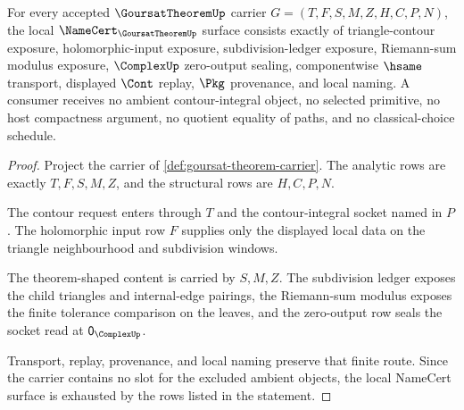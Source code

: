 \begin{theorem}
\label{thm:goursat-theorem-namecert-obligations}
For every accepted $\GoursatTheoremUp$ carrier $G=(T,F,S,M,Z,H,C,P,N)$, the local $\NameCert_{\GoursatTheoremUp}$ surface consists exactly of triangle-contour exposure, holomorphic-input exposure, subdivision-ledger exposure, Riemann-sum modulus exposure, $\ComplexUp$ zero-output sealing, componentwise $\hsame$ transport, displayed $\Cont$ replay, $\Pkg$ provenance, and local naming. A consumer receives no ambient contour-integral object, no selected primitive, no host compactness argument, no quotient equality of paths, and no classical-choice schedule.
\end{theorem}
\begin{proof}
Project the carrier of \autoref{def:goursat-theorem-carrier}. The analytic rows are exactly $T,F,S,M,Z$, and the structural rows are $H,C,P,N$.

The contour request enters through $T$ and the contour-integral socket named in $P$. The holomorphic input row $F$ supplies only the displayed local data on the triangle neighbourhood and subdivision windows.

The theorem-shaped content is carried by $S,M,Z$. The subdivision ledger exposes the child triangles and internal-edge pairings, the Riemann-sum modulus exposes the finite tolerance comparison on the leaves, and the zero-output row seals the socket read at $\mathsf{0}_{\ComplexUp}$.

Transport, replay, provenance, and local naming preserve that finite route. Since the carrier contains no slot for the excluded ambient objects, the local NameCert surface is exhausted by the rows listed in the statement.
\end{proof}


